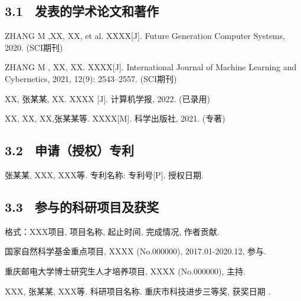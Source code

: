 \subsection{3.1 \ 发表的学术论文和著作}
\begin{achievements}
	\item ZHANG M ,XX, XX, et al. XXXX[J]. Future Generation Computer Systems, 2020. (SCI期刊)
	
	\item ZHANG M , XX, XX. XXXX[J]. International Journal of Machine Learning and Cybernetics, 2021, 12(9): 2543–2557. (SCI期刊)
	
	\item XX, 张某某, XX. XXXX [J]. 计算机学报, 2022. (已录用)
	
	\item XX, XX, XX,张某某等. XXXX[M]. 科学出版社, 2021. (专著)
\end{achievements}

\subsection{3.2 \ 申请（授权）专利}

\begin{achievements}
	\item 张某某, XXX, XXX等. 专利名称: 专利号[P]. 授权日期.
\end{achievements}

\subsection{3.3 \ 参与的科研项目及获奖}

格式：XXX项目, 项目名称, 起止时间, 完成情况, 作者贡献.
\begin{achievements}
	\item 国家自然科学基金重点项目, XXXX (No.000000), 2017.01-2020.12, 参与.
	
	\item 重庆邮电大学博士研究生人才培养项目, XXXX (No.000000), 主持.
	
	\item XXX, 张某某, XXX等. 科研项目名称. 重庆市科技进步三等奖, 获奖日期 .
\end{achievements}



